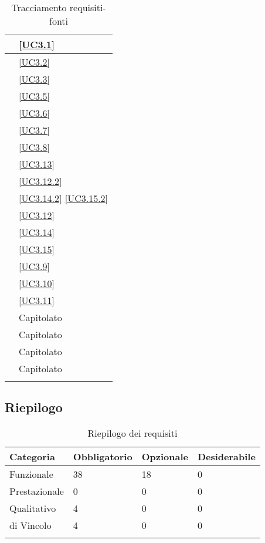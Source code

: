 \begin{longtable}{|P{6cm}|P{6cm}|}
	\hline {} & \ref{UC3.1} \\
	\hline {} & \ref{UC3.2} \\
	\hline {} & \ref{UC3.3} \\
	\hline {} & \ref{UC3.5} \\
	\hline {} & \ref{UC3.6} \\
	\hline {} & \ref{UC3.7} \\
	\hline {} & \ref{UC3.8} \\
	\hline {} & \ref{UC3.13} \\
	\hline {} & \ref{UC3.12.2} \\
	\hline {} & \ref{UC3.14.2} \linebreak \ref{UC3.15.2} \\
	\hline {} & \ref{UC3.12} \\
	\hline {} & \ref{UC3.14} \\
	\hline {} & \ref{UC3.15} \\
	\hline {} & \ref{UC3.9} \\
	\hline {} & \ref{UC3.10} \\
	\hline {} & \ref{UC3.11} \\
	\hline {} & Capitolato \\
	\hline {} & Capitolato \\
	\hline {} & Capitolato \\
	\hline {} & Capitolato \\	
	\hline
	\caption{Tracciamento requisiti-fonti}
\end{longtable}

\subsection{Riepilogo}

\begin{longtable}{|P{3cm}|P{3cm}|P{3cm}|P{3cm}|}
	\hline \textbf{Categoria} & \textbf{Obbligatorio} & \textbf{Opzionale} & \textbf{Desiderabile} \\
	\hline Funzionale & 38 & 18 & 0 \\
	\hline Prestazionale & 0 & 0 & 0 \\
	\hline Qualitativo & 4 & 0 & 0 \\
	\hline di Vincolo & 4 & 0 & 0 \\
	\hline
	\caption{Riepilogo dei requisiti}
\end{longtable}
